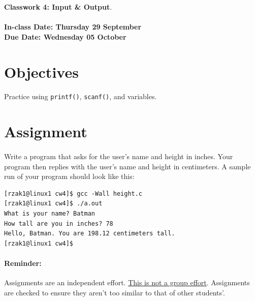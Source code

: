 \documentclass[letter,11pt]{article}
\begin{document}
\huge
\textbf{Classwork 4: Input \& Output}.
\normalsize
\\ ~~ \\
\textbf{In-class Date: Thursday 29 September} \\
\textbf{Due Date: Wednesday 05 October}

\section*{Objectives}
\paragraph{}Practice using \texttt{printf()}, \texttt{scanf()}, and variables.

\section*{Assignment}
\paragraph{}Write a program that asks for the user's name and height in inches. Your program then replies with the user's name and height in centimeters. A sample run of your program should look like this:
\begin{verbatim}
[rzak1@linux1 cw4]$ gcc -Wall height.c 
[rzak1@linux1 cw4]$ ./a.out
What is your name? Batman
How tall are you in inches? 78
Hello, Batman. You are 198.12 centimeters tall.
[rzak1@linux1 cw4]$ 
\end{verbatim}

\paragraph{Reminder:} Assignments are an independent effort. \underline{This is not a group effort}. Assignments are checked to ensure they aren't too similar to that of other students'.
\end{document}
